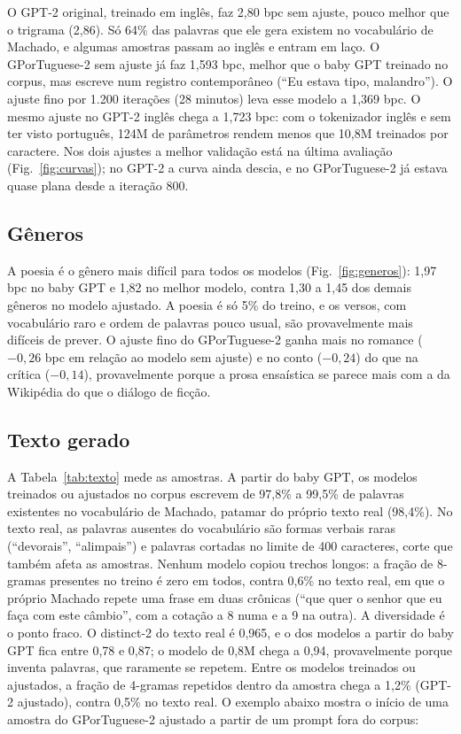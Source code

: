 \documentclass[conference]{IEEEtran}
\begin{document}
O GPT-2 original, treinado em inglês, faz 2,80 bpc sem ajuste, pouco melhor que o trigrama (2,86). Só 64\% das palavras que ele gera existem no vocabulário de Machado, e algumas amostras passam ao inglês e entram em laço. O GPorTuguese-2 sem ajuste já faz 1,593 bpc, melhor que o baby GPT treinado no corpus, mas escreve num registro contemporâneo (``Eu estava tipo, malandro''). O ajuste fino por 1.200 iterações (28 minutos) leva esse modelo a 1,369 bpc. O mesmo ajuste no GPT-2 inglês chega a 1,723 bpc: com o tokenizador inglês e sem ter visto português, 124M de parâmetros rendem menos que 10,8M treinados por caractere. Nos dois ajustes a melhor validação está na última avaliação (Fig.~\ref{fig:curvas}); no GPT-2 a curva ainda descia, e no GPorTuguese-2 já estava quase plana desde a iteração 800.

\subsection{Gêneros}

A poesia é o gênero mais difícil para todos os modelos (Fig.~\ref{fig:generos}): 1,97 bpc no baby GPT e 1,82 no melhor modelo, contra 1,30 a 1,45 dos demais gêneros no modelo ajustado. A poesia é só 5\% do treino, e os versos, com vocabulário raro e ordem de palavras pouco usual, são provavelmente mais difíceis de prever. O ajuste fino do GPorTuguese-2 ganha mais no romance ($-0{,}26$ bpc em relação ao modelo sem ajuste) e no conto ($-0{,}24$) do que na crítica ($-0{,}14$), provavelmente porque a prosa ensaística se parece mais com a da Wikipédia do que o diálogo de ficção.

\subsection{Texto gerado}

A Tabela~\ref{tab:texto} mede as amostras. A partir do baby GPT, os modelos treinados ou ajustados no corpus escrevem de 97,8\% a 99,5\% de palavras existentes no vocabulário de Machado, patamar do próprio texto real (98,4\%). No texto real, as palavras ausentes do vocabulário são formas verbais raras (``devorais'', ``alimpais'') e palavras cortadas no limite de 400 caracteres, corte que também afeta as amostras. Nenhum modelo copiou trechos longos: a fração de 8-gramas presentes no treino é zero em todos, contra 0,6\% no texto real, em que o próprio Machado repete uma frase em duas crônicas (``que quer o senhor que eu faça com este câmbio'', com a cotação a 8 numa e a 9 na outra). A diversidade é o ponto fraco. O distinct-2 do texto real é 0,965, e o dos modelos a partir do baby GPT fica entre 0,78 e 0,87; o modelo de 0,8M chega a 0,94, provavelmente porque inventa palavras, que raramente se repetem. Entre os modelos treinados ou ajustados, a fração de 4-gramas repetidos dentro da amostra chega a 1,2\% (GPT-2 ajustado), contra 0,5\% no texto real. O exemplo abaixo mostra o início de uma amostra do GPorTuguese-2 ajustado a partir de um prompt fora do corpus:
\end{document}
